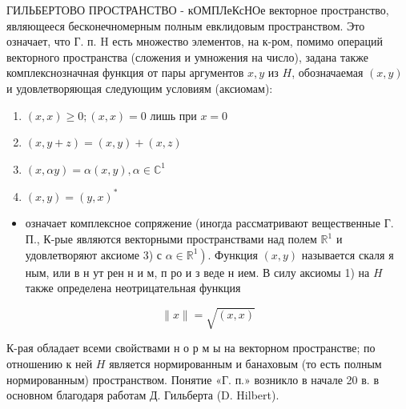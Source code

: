 \documentclass[10pt]{article}
\begin{document}
ГИЛЬБЕРТОВО ПРОСТРАНСТВО - кОМПЛеКсНОе векторное пространство, являющееся бесконечномерным полным евклидовым пространством. Это означает, что Г. п. H есть множество элементов, на к-ром, помимо операций векторного пространства (сложения и умножения на число), задана также комплекснозначная функция от пары аргументов $x, y$ из $H$, обозначаемая $(x, y)$ и удовлетворяющая следующим условиям (аксиомам):



\begin{enumerate}

  \item $(x, x) \geqslant 0 ;(x, x)=0$ лишь при $x=0$



  \item $(x, y+z)=(x, y)+(x, z)$



  \item $(x, \alpha y)=\alpha(x, y), \alpha \in \mathbb{C}^{1}$



  \item $(x, y)=(y, x)^{*}$



\end{enumerate}



\begin{itemize}

  \item означает комплексное сопряжение (иногда рассматривают вещественные Г. П., К-рые являются векторными пространствами над полем $\mathbb{R}^{1}$ и удовлетворяют аксиоме 3) с $\left.\alpha \in \mathbb{R}^{1}\right)$. Функция $(x, y)$ называется скаля я ным, или в н ут рен н и м, п ро и з веде н ием. В силу аксиомы 1) на $H$ также определена неотрицательная функция

\end{itemize}



\[

\|x\|=\sqrt{(x, x)}

\]



К-рая обладает всеми свойствами н о р м ы на векторном пространстве; по отношению к ней $H$ является нормированным и банаховым (то есть полным нормированным) пространством. Понятие «Г. п.» возникло в начале 20 в. в основном благодаря работам Д. Гильберта (D. Hilbert).
\end{document}
